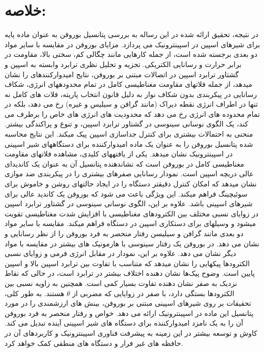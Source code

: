 \section{خلاصه:} 
در نتیجه، تحقیق ارائه شده در این رساله به بررسی پتانسیل بوروفن به عنوان ماده پایه برای شیرهای اسپین در اسپینترونیک می پردازد. مزایای بوروفن در مقایسه با سایر مواد دو بعدی برجسته شده است، از جمله کارهایی مانند چگالی کم، سختی بالا، مقاومت در برابر حرارت و رسانایی الکتریکی. تجزیه و تحلیل نظری ترابرد وابسته به اسپین و گشتاور ترابرد اسپین در اتصالات  مبتنی بر بوروفن، نتایج امیدوارکنندهای را نشان میدهد، از جمله فلاتهای مقاومت مغناطیسی کامل در تمام محدودههای انرژی، شکاف رسانایی در پیکربندی  بدون شکاف نوار به دلیل قانون انتخاب پاریته، فلات های کامل  نه تنها در اطراف انرژی نقطه دیراک (مانند گرافن و سیلیس و غیره) رخ می دهد، بلکه در تمام محدوده های انرژی رخ می دهد که محدودیت های انرژی های خاص را برطرف می کند، یک الگوی نوسانی سینوسی در گشتاور ترابرد اسپین، و تنوع و پراکندگی بیشتر. منحنی  به احتمالات بیشتری برای کنترل جداسازی اسپین پیک میکند. این نتایج محاسبه شده پتانسیل بوروفن را به عنوان یک ماده امیدوارکننده برای دستگاههای شیر اسپینی در اسپینترونیک نشان میدهد. یکی از یافتههای کلیدی، مشاهده فلاتهای مقاومت مغناطیسی کامل در بوروفن است که نشاندهنده پتانسیل آن به عنوان یک کاندیدای عالی دریچه اسپین است. نمودار رسانایی صفرهای بیشتری را در پیکربندی ضد موازی نشان میدهد که امکان کنترل دقیقتر دستگاه را در ایجاد حالتهای روشن و خاموش برای سوئیچینگ فراهم میکند. این ویژگی باعث می شود که بوروفن یک کاندید عالی برای شیرهای اسپینی باشد. علاوه بر این، الگوی نوسانی سینوسی در گشتاور ترابرد اسپین  در زوایای نسبی مختلف بین الکترودهای مغناطیسی با افزایش شدت مغناطیسی تقویت میشود و وسیلهای برای دستکاری اسپین در دستگاه فراهم میکند. مقایسه با سایر مواد دو بعدی مانند گرافن و سیلیسن رفتار منحصر به فرد بوروفن را از نظر رسانایی و  نشان می دهد.  در بوروفن یک رفتار سینوسی با هارمونیک های بیشتر در مقایسه با مواد دیگر نشان می دهد. علاوه بر این، نمودار  در مقابل انرژی فرمی و زوایای نسبی الکترودها پیکهایی را نشان میدهد که متناسب با تفاوت بین ترابرد اسپین بالا و اسپین پایین است. وضوح پیک‌ها نشان دهنده اختلاف بیشتر در ترابرد است، در حالی که نقاط نزدیک به صفر  نشان دهنده تفاوت بسیار کمی است.  همچنین به زاویه نسبی بین الکترودها بستگی دارد، با صفر  در زوایایی که مضربی از $\theta$ هستند. به طور کلی، تحقیقات بر روی شیرهای اسپینی مبتنی بر بوروفن، بینش های ارزشمندی را در مورد پتانسیل این ماده در اسپینترونیک ارائه می دهد. خواص و رفتار منحصر به فرد بوروفن آن را به یک نامزد امیدوارکننده برای دستگاه های شیر اسپینی آینده تبدیل می کند. کاوش و توسعه بیشتر در این زمینه به پیشرفت فناوری اسپینترونیک و کاربردهای آن در حافظه های غیر فرار و دستگاه های منطقی کمک خواهد کرد.

